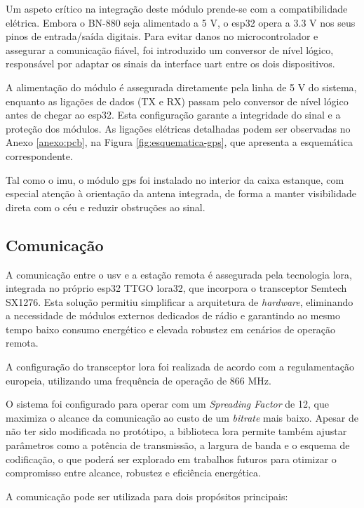 Um aspeto crítico na integração deste módulo prende-se com a compatibilidade elétrica. Embora o BN-880 seja alimentado a 5 V, o \gls{esp32} opera a 3.3 V nos seus pinos de entrada/saída digitais. Para evitar danos no microcontrolador e assegurar a comunicação fiável, foi introduzido um conversor de nível lógico, responsável por adaptar os sinais da interface \gls{uart} entre os dois dispositivos.  

A alimentação do módulo é assegurada diretamente pela linha de 5 V do sistema, enquanto as ligações de dados (TX e RX) passam pelo conversor de nível lógico antes de chegar ao \gls{esp32}. Esta configuração garante a integridade do sinal e a proteção dos módulos. As ligações elétricas detalhadas podem ser observadas no Anexo \ref{anexo:pcb}, na Figura \ref{fig:esquematica-gps}, que apresenta a esquemática correspondente.  

Tal como o \gls{imu}, o módulo \gls{gps} foi instalado no interior da caixa estanque, com especial atenção à orientação da antena integrada, de forma a manter visibilidade direta com o céu e reduzir obstruções ao sinal.

\subsection{Comunicação}

A comunicação entre o \gls{usv} e a estação remota é assegurada pela tecnologia \acrfull{lora}, integrada no próprio \gls{esp32} TTGO \gls{lora}32, que incorpora o transceptor Semtech SX1276. Esta solução permitiu simplificar a arquitetura de \emph{\emph{hardware}}, eliminando a necessidade de módulos externos dedicados de rádio e garantindo ao mesmo tempo baixo consumo energético e elevada robustez em cenários de operação remota.  

A configuração do transceptor \gls{lora} foi realizada de acordo com a regulamentação europeia, utilizando uma frequência de operação de 866 MHz. 

O sistema foi configurado para operar com um \emph{Spreading Factor} de 12, que maximiza o alcance da comunicação ao custo de um \emph{bitrate} mais baixo. Apesar de não ter sido modificada no protótipo, a biblioteca \gls{lora} permite também ajustar parâmetros como a potência de transmissão, a largura de banda e o esquema de codificação, o que poderá ser explorado em trabalhos futuros para otimizar o compromisso entre alcance, robustez e eficiência energética.  

A comunicação pode ser utilizada para dois propósitos principais:  

